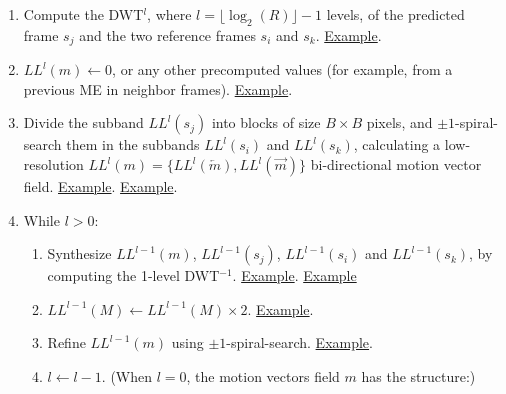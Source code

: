 \begin{enumerate}
\tightlist

\item
  Compute the DWT$^l$, where $l=\lfloor\log_2(R)\rfloor-1$ levels,
  of the predicted frame $s_j$ and the two reference frames $s_i$
  and $s_k$.
  \href{https://vicente-gonzalez-ruiz.github.io/video_compression/graphics/frame_interpolation_step_1.svg}{Example}.

\item
  $LL^l(m)\leftarrow 0$, or any other precomputed values (for example,
  from a previous ME in neighbor frames).
  \href{https://vicente-gonzalez-ruiz.github.io/video_compression/graphics/frame_interpolation_step_2.svg}{Example}.

\item
  Divide the subband $LL^l(s_j)$ into blocks of size $B\times B$
  pixels, and $\pm 1$-spiral-search them in the subbands $LL^l(s_i)$
  and $LL^l(s_k)$, calculating a low-resolution
  $LL^l(m)=\{LL^l(\overleftarrow{m}), LL^l(\overrightarrow{m})\}$
  bi-directional motion vector field. 
  \href{https://vicente-gonzalez-ruiz.github.io/video_compression/graphics/frame_interpolation_step_3A.svg}{Example}.
  \href{https://vicente-gonzalez-ruiz.github.io/video_compression/graphics/frame_interpolation_step_3A_bis.svg}{Example}.
\item
  While $l>0$:
  
  \begin{enumerate}
    
  \item
    Synthesize $LL^{l-1}(m)$, $LL^{l-1}(s_j)$, $LL^{l-1}(s_i)$
    and $LL^{l-1}(s_k)$, by computing the 1-level DWT$^{-1}$.
    \href{https://vicente-gonzalez-ruiz.github.io/video_compression/graphics/frame_interpolation_step_4A.svg}{Example}.
    \href{https://vicente-gonzalez-ruiz.github.io/video_compression/graphics/frame_interpolation_step_4A_bis.svg}{Example}

  \item
    $LL^{l-1}(M)\leftarrow LL^{l-1}(M)\times 2$.
    \href{https://vicente-gonzalez-ruiz.github.io/video_compression/graphics/frame_interpolation_step_4B.svg}{Example}.
  
  \item
    Refine $LL^{l-1}(m)$ using $\pm 1$-spiral-search.
    \href{https://vicente-gonzalez-ruiz.github.io/video_compression/graphics/frame_interpolation_step_4C.svg}{Example}.
  
  \item
  $l\leftarrow l-1$. (When $l=0$, the motion vectors field $m$
  has the structure:)
  

\end{enumerate}
\end{enumerate}
